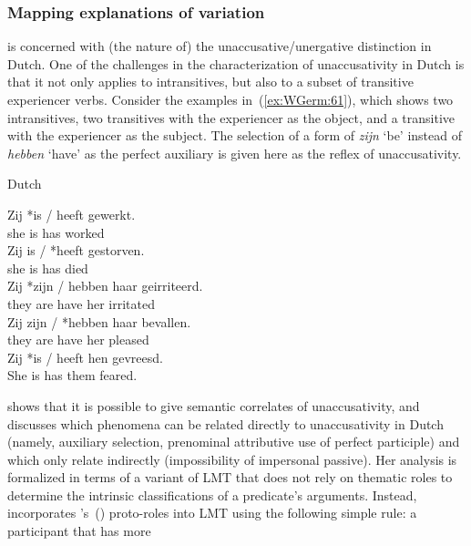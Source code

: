 \documentclass[output=paper,hidelinks]{langscibook}
\begin{document}
\subsubsection{Mapping explanations of variation\label{sec:Germanic:mappingvariation}}
\citet{zaenen93} is concerned with (the nature of) the
unaccusative/unergative distinction in Dutch.  One of the challenges
in the characterization of unaccusativity in Dutch is that it not only
applies to intransitives, but also to a subset of transitive
experiencer verbs. Consider the examples in~(\ref{ex:WGerm:61}), which shows two
intransitives, two transitives with the experiencer as the object, and
a transitive with the experiencer as the subject. The selection of a
form of \textit{zijn} `be' instead of \textit{hebben} `have' as the
perfect auxiliary is given here as the reflex of unaccusativity.
%
\begin{exe}
  \ex\label{ex:WGerm:61} Dutch
  \begin{xlist}
    \ex \gll Zij *is / heeft gewerkt.\\
             she \phantom{*}is {} has worked\\
    \ex \gll Zij is / *heeft gestorven.\\
             she is {} \phantom{*}has died\\
    \ex \gll Zij *zijn / hebben haar geirriteerd.\\
             they \phantom{*}are {} have her irritated\\
    \ex \gll Zij zijn / *hebben haar bevallen.\\
             they are {} \phantom{*}have her pleased\\
    \ex \gll Zij *is / heeft hen gevreesd.\\
             She \phantom{*}is {} has them feared.\\
  \end{xlist}
\end{exe}
%
\citeauthor{zaenen93} shows that it is possible to give
semantic correlates of unaccusativity, and discusses which phenomena
can be related directly to unaccusativity in Dutch (namely, auxiliary
selection, prenominal attributive use of perfect participle) and which only relate
indirectly (impossibility of impersonal passive). Her analysis is
formalized in terms of a variant of LMT that does not rely on thematic
roles to determine the intrinsic classifications of a predicate's
arguments. Instead, \citeauthor{zaenen93} incorporates
\citeauthor{Dowty1991}'s~(\citeyear{Dowty1991}) proto-roles into LMT
using the following simple rule: a participant that has more
\end{document}
